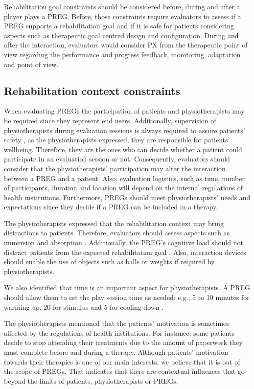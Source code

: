 Rehabilitation goal constraints should be considered before, during and after a player plays a \ac{PREG}. Before, those constraints require evaluators to assess if a \ac{PREG} supports a rehabilitation goal and if it is safe for patients considering aspects such as therapeutic goal centred design and configuration. During and after the interaction, evaluators would consider \ac{PX} from the therapeutic point of view regarding the performance and progress feedback, monitoring, adaptation and point of view.

\subsection{Rehabilitation context constraints}
When evaluating \acp{PREG} the participation of patients and physiotherapists may be required since they represent end users. Additionally, supervision of physiotherapists during evaluation sessions is always required to assure patients' safety \autocite{Wiemeyer2015}, as the physiotherapists expressed, they are responsible for patients' wellbeing. Therefore, they are the ones who can decide whether a patient could participate in an evaluation session or not. Consequently, evaluators should consider that the physiotherapists' participation may alter the interaction between a \ac{PREG} and a patient.  Also, evaluation logistics, such as time, number of participants, duration and location will depend on the internal regulations of health institutions. Furthermore, \acp{PREG} should meet physiotherapists' needs and expectations since they decide if a \ac{PREG} can be included in a therapy.

The physiotherapists expressed that the rehabilitation context may bring distractions to patients. Therefore, evaluators should assess aspects such as immersion and absorption \autocite{Lapas2015}. Additionally, the \ac{PREG}'s cognitive load should not distract patients from the expected rehabilitation goal \autocite{Isbister2015,Sinclair2007}. Also, interaction devices should enable the use of objects such as balls or weights if required by physiotherapists.

We also identified that time is an important aspect for physiotherapists. A \ac{PREG} should allow them to set the play session time as needed; e.g., 5 to 10 minutes for warming up, 20 for stimulus and 5 for cooling down \autocite{Sinclair2007}.

The physiotherapists mentioned that the patients' motivation is sometimes affected by the regulations of health institutions. For instance, some patients decide to stop attending their treatments due to the amount of paperwork they must complete before and during a therapy. Although patients' motivation towards their therapies is one of our main interests, we believe that it is out of the scope of \acp{PREG}. That indicates that there are contextual influences that go beyond the limits of patients, physiotherapists or \acp{PREG}.

